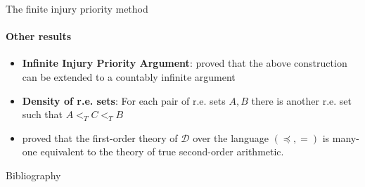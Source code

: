 \documentclass{beamer}
\begin{document}
\begin{frame}{The finite injury priority method}
\framesubtitle{Other results}
    \begin{itemize}[<+->]
        \item \textbf{Infinite Injury Priority Argument}: \textcite{sacks} proved that the above construction can be extended to a countably infinite argument
        
        \item \textbf{Density of r.e. sets}: For each pair of r.e. sets $A, B$ there is another r.e. set such that $A <_T C <_T B$
        \item \textcite{simpson} proved that the first-order theory of $\mathcal{D}$ over the language $(\preceq, = )$ is many-one equivalent to the theory of true second-order arithmetic. 
    \end{itemize}
\end{frame}
    
\begin{frame}{Bibliography}
\framesubtitle{{}}
    \printbibliography
\end{frame}
\end{document}
